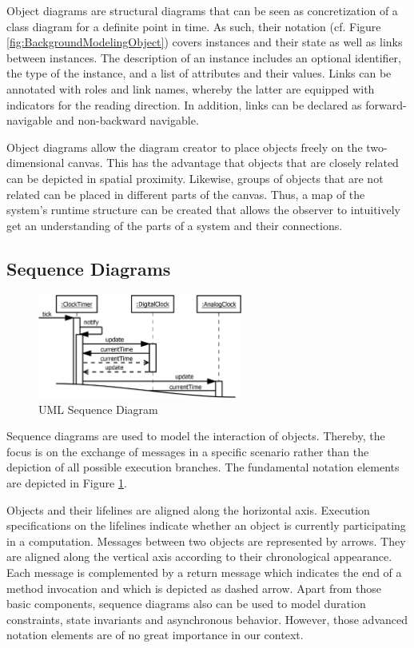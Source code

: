 Object diagrams \cite{rumbaugh_unified_2010} are structural diagrams that can be seen as concretization of a class diagram for a definite point in time.
As such, their notation (cf. Figure \ref{fig:BackgroundModelingObject}) covers instances and their state as well as links between instances.
The description of an instance includes an optional identifier, the type of the instance, and a list of attributes and their values.
Links can be annotated with roles and link names, whereby the latter are equipped with indicators for the reading direction.
In addition, links can be declared as forward-navigable and non-backward navigable.

Object diagrams allow the diagram creator to place objects freely on the two-dimensional canvas.
This has the advantage that objects that are closely related can be depicted in spatial proximity.
Likewise, groups of objects that are not related can be placed in different parts of the canvas.
Thus, a map of the system's runtime structure can be created that allows the observer to intuitively get an understanding of the parts of a system and their connections.

\subsection{Sequence Diagrams}
\label{ss:BackgroundModelingSequence}

\begin{figure}
	\centering
	\includegraphics[width=0.6\textwidth]{../images/02-Sequence}
	\caption[TOC Caption]{UML Sequence Diagram}
	\label{fig:BackgroundModelingSequence}
\end{figure}

Sequence diagrams \cite{rumbaugh_unified_2010} are used to model the interaction of objects.
Thereby, the focus is on the exchange of messages in a specific scenario rather than the depiction of all possible execution branches.
The fundamental notation elements are depicted in Figure \ref{fig:BackgroundModelingSequence}.

Objects and their lifelines are aligned along the horizontal axis.
Execution specifications on the lifelines indicate whether an object is currently participating in a computation.
Messages between two objects are represented by arrows.
They are aligned along the vertical axis according to their chronological appearance.
Each message is complemented by a return message which indicates the end of a method invocation and which is depicted as dashed arrow.
Apart from those basic components, sequence diagrams also can be used to model duration constraints, state invariants and asynchronous behavior.
However, those advanced notation elements are of no great importance in our context.

